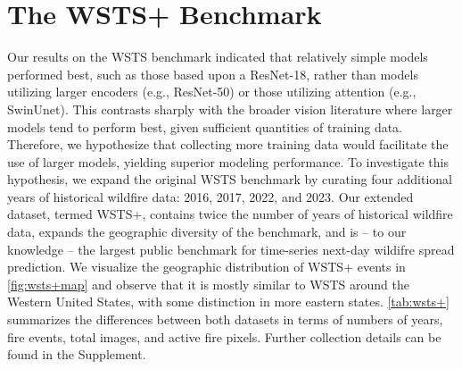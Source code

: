 
\section{The WSTS+ Benchmark}
\label{sec:wsts+}

Our results on the WSTS benchmark indicated that relatively simple models performed best, such as those based upon a ResNet-18, rather than models utilizing larger encoders (e.g., ResNet-50) or those utilizing attention (e.g., SwinUnet).  This contrasts sharply with the broader vision literature where larger models tend to perform best, given sufficient quantities of training data.  Therefore, we hypothesize that collecting more training data would facilitate the use of larger models, yielding superior modeling performance. To investigate this hypothesis, we expand the original WSTS benchmark by curating four additional years of historical wildfire data: 2016, 2017, 2022, and 2023. Our extended dataset, termed WSTS+, contains twice the number of years of historical wildfire data, expands the geographic diversity of the benchmark, and is -- to our knowledge -- the largest public benchmark for time-series next-day wildifre spread prediction. We visualize the geographic distribution of WSTS+ events in \cref{fig:wsts+map} and observe that it is mostly similar to WSTS around the Western United States, with some distinction in more eastern states. \cref{tab:wsts+} summarizes the differences between both datasets in terms of numbers of years, fire events, total images, and active fire pixels. Further collection details can be found in the Supplement.

\begin{table}[h!]
    \centering
    \caption{Comparison between the original WSTS dataset and our extension. We double the number of years and total images and drastically increase the number of fire events and active fire pixels.}
    \label{tab:wsts+}

\end{table}

